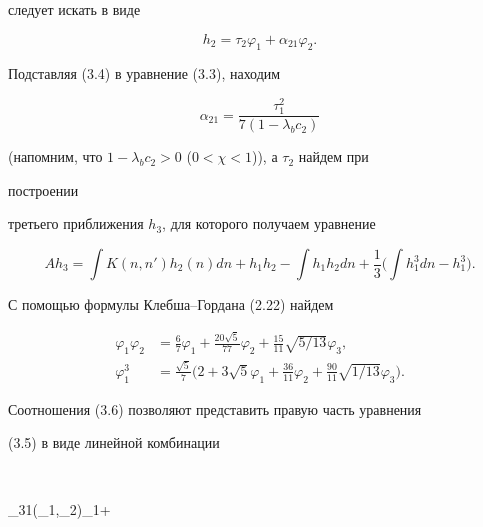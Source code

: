 следует искать в виде 


\begin{equation} 


h_2=\tau_2\varphi_1+\alpha_{21}\varphi_2.\tag{3.4} 


\end{equation} 


Подставляя (3.4) в уравнение (3.3), находим  


$$ 


\alpha_{21}=\frac{\tau^2_1}{7(1-\lambda_b c_2)} 


$$ 


(напомним, что $1-\lambda_b c_2>0$ ($0<\chi<1$)), а $\tau_2$ найдем при 


построении 


третьего приближения $h_3$, для которого получаем уравнение 


\begin{equation} 


A h_3=\int K(n,n')h_2(n)dn+h_1h_2-\int h_1h_2dn+\frac{1}{3} 


\Big(\int h^3_1dn-h^3_1\Big).\tag{3.5} 


\end{equation} 


С помощью формулы Клебша--Гордана (2.22) найдем 


\begin{equation} 


\begin{split} 


\varphi_1\varphi_2&=\frac{6}{7}\varphi_1+ 


\frac{20\sqrt{5}}{77}\varphi_2+\frac{15}{11}\sqrt{5/13} 


\varphi_3, \\ 


\varphi^3_1&=\frac{\sqrt{5}}{7}\bigg(2+3\sqrt{5}\varphi_1+ 


\frac{36}{11}\varphi_2+\frac{90}{11}\sqrt{1/13} 


\varphi_3\bigg). 


\end{split} 


\tag{3.6} 


\end{equation} 


Соотношения (3.6) позволяют представить правую часть уравнения  


(3.5) в виде линейной комбинации 


$$ 


\beta_{31}(\tau_1,\tau_2)\varphi_1+ 


